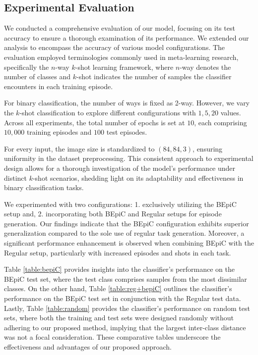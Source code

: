 \subsection{Experimental Evaluation}

We conducted a comprehensive evaluation of our model, focusing on its test accuracy to ensure a thorough examination of its performance. We extended our analysis to encompass the accuracy of various model configurations. The evaluation employed terminologies commonly used in meta-learning research, specifically the $n$-way $k$-shot learning framework, where $n$-way denotes the number of classes and $k$-shot indicates the number of samples the classifier encounters in each training episode. 

For binary classification, the number of ways is fixed as 2-way. However, we vary the $k$-shot classification to explore different configurations with $1, 5, 20$ values. Across all experiments, the total number of epochs is set at $10$, each comprising $10,000$ training episodes and $100$ test episodes.

For every input, the image size is standardized to $(84, 84, 3)$, ensuring uniformity in the dataset preprocessing. This consistent approach to experimental design allows for a thorough investigation of the model's performance under distinct $k$-shot scenarios, shedding light on its adaptability and effectiveness in binary classification tasks.


We experimented with two configurations: 1. exclusively utilizing the BEpiC setup and, 2. incorporating both BEpiC and Regular setups for episode generation. Our findings indicate that the BEpiC configuration exhibits superior generalization compared to the sole use of regular task generation. Moreover, a significant performance enhancement is observed when combining BEpiC with the Regular setup, particularly with increased episodes and shots in each task.

Table \ref{table:bepiC} provides insights into the classifier's performance on the BEpiC test set, where the test class comprises samples from the most dissimilar classes. On the other hand, Table \ref{table:reg+bepiC} outlines the classifier's performance on the BEpiC test set in conjunction with the Regular test data. Lastly, Table \ref{table:random} provides the classifier's performance on random test sets, where both the training and test sets were designed randomly without adhering to our proposed method, implying that the largest inter-class distance was not a focal consideration. These comparative tables underscore the effectiveness and advantages of our proposed approach.

